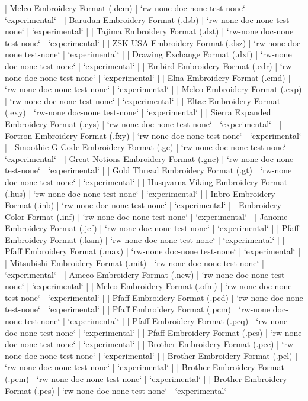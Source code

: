 \documentclass{report}
\begin{document}
| Melco Embroidery Format (.dem) | `rw-none doc-none test-none` | `experimental` |
| Barudan Embroidery Format (.dsb) | `rw-none doc-none test-none` | `experimental` |
| Tajima Embroidery Format (.dst) | `rw-none doc-none test-none` | `experimental` |
| ZSK USA Embroidery Format (.dsz) | `rw-none doc-none test-none` | `experimental` |
| Drawing Exchange Format (.dxf) | `rw-none doc-none test-none` | `experimental` |
| Embird Embroidery Format (.edr) | `rw-none doc-none test-none` | `experimental` |
| Elna Embroidery Format (.emd) | `rw-none doc-none test-none` | `experimental` |
| Melco Embroidery Format (.exp) | `rw-none doc-none test-none` | `experimental` |
| Eltac Embroidery Format (.exy) | `rw-none doc-none test-none` | `experimental` |
| Sierra Expanded Embroidery Format (.eys) | `rw-none doc-none test-none` | `experimental` |
| Fortron Embroidery Format (.fxy) | `rw-none doc-none test-none` | `experimental` |
| Smoothie G-Code Embroidery Format (.gc) | `rw-none doc-none test-none` | `experimental` |
| Great Notions Embroidery Format (.gnc) | `rw-none doc-none test-none` | `experimental` |
| Gold Thread Embroidery Format (.gt) | `rw-none doc-none test-none` | `experimental` |
| Husqvarna Viking Embroidery Format (.hus) | `rw-none doc-none test-none` | `experimental` |
| Inbro Embroidery Format (.inb) | `rw-none doc-none test-none` | `experimental` |
| Embroidery Color Format (.inf) | `rw-none doc-none test-none` | `experimental` |
| Janome Embroidery Format (.jef) | `rw-none doc-none test-none` | `experimental` |
| Pfaff Embroidery Format (.ksm) | `rw-none doc-none test-none` | `experimental` |
| Pfaff Embroidery Format (.max) | `rw-none doc-none test-none` | `experimental` |
| Mitsubishi Embroidery Format (.mit) | `rw-none doc-none test-none` | `experimental` |
| Ameco Embroidery Format (.new) | `rw-none doc-none test-none` | `experimental` |
| Melco Embroidery Format (.ofm) | `rw-none doc-none test-none` | `experimental` |
| Pfaff Embroidery Format (.pcd) |  `rw-none doc-none test-none` | `experimental` |
| Pfaff Embroidery Format (.pcm) | `rw-none doc-none test-none` | `experimental` |
| Pfaff Embroidery Format (.pcq) | `rw-none doc-none test-none` | `experimental` |
| Pfaff Embroidery Format (.pcs) | `rw-none doc-none test-none` | `experimental` |
| Brother Embroidery Format (.pec) | `rw-none doc-none test-none` | `experimental` |
| Brother Embroidery Format (.pel) | `rw-none doc-none test-none` | `experimental` |
| Brother Embroidery Format (.pem) | `rw-none doc-none test-none` | `experimental` |
| Brother Embroidery Format (.pes) | `rw-none doc-none test-none` | `experimental` |
\end{document}
